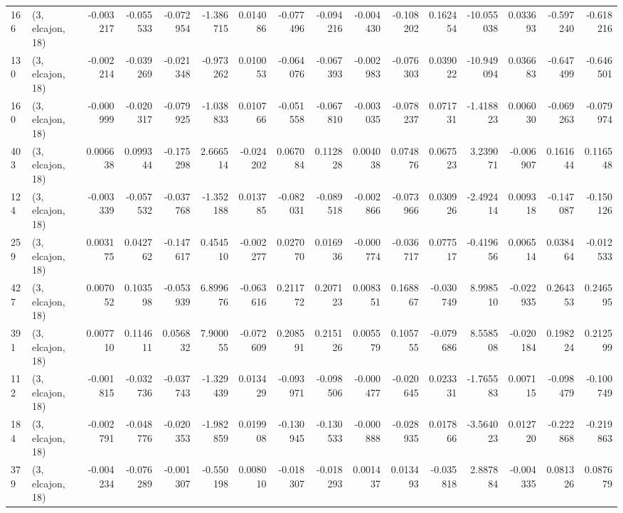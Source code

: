\begin{tabular}{llrrrrrrrrrrrrrr}
166 &  (3, elcajon, 18) &  -0.003217 & -0.055533 & -0.072954 &    -1.386715 &   0.014086 &  -0.077496 &  -0.094216 & -0.004430 & -0.108202 &  0.162454 &  -10.055038 &  0.033693 & -0.597240 & -0.618216 \\
130 &  (3, elcajon, 18) &  -0.002214 & -0.039269 & -0.021348 &    -0.973262 &   0.010053 &  -0.064076 &  -0.067393 & -0.002983 & -0.076303 &  0.039022 &  -10.949094 &  0.036683 & -0.647499 & -0.646501 \\
160 &  (3, elcajon, 18) &  -0.000999 & -0.020317 & -0.079925 &    -1.038833 &   0.010766 &  -0.051558 &  -0.067810 & -0.003035 & -0.078237 &  0.071731 &   -1.418823 &  0.006030 & -0.069263 & -0.079974 \\
403 &  (3, elcajon, 18) &   0.006638 &  0.099344 & -0.175298 &     2.666514 &  -0.024202 &   0.067084 &   0.112828 &  0.004038 &  0.074876 &  0.067523 &    3.239071 & -0.006907 &  0.161644 &  0.116548 \\
124 &  (3, elcajon, 18) &  -0.003339 & -0.057532 & -0.037768 &    -1.352188 &   0.013785 &  -0.082031 &  -0.089518 & -0.002866 & -0.073966 &  0.030926 &   -2.492414 &  0.009318 & -0.147087 & -0.150126 \\
259 &  (3, elcajon, 18) &   0.003175 &  0.042762 & -0.147617 &     0.454510 &  -0.002277 &   0.027070 &   0.016936 & -0.000774 & -0.036717 &  0.077517 &   -0.419656 &  0.006514 &  0.038464 & -0.012533 \\
427 &  (3, elcajon, 18) &   0.007052 &  0.103598 & -0.053939 &     6.899676 &  -0.063616 &   0.211772 &   0.207123 &  0.008351 &  0.168867 & -0.030749 &    8.998510 & -0.022935 &  0.264353 &  0.246595 \\
391 &  (3, elcajon, 18) &   0.007710 &  0.114611 &  0.056832 &     7.900055 &  -0.072609 &   0.208591 &   0.215126 &  0.005579 &  0.105755 & -0.079686 &    8.558508 & -0.020184 &  0.198224 &  0.212599 \\
112 &  (3, elcajon, 18) &  -0.001815 & -0.032736 & -0.037743 &    -1.329439 &   0.013429 &  -0.093971 &  -0.098506 & -0.000477 & -0.020645 &  0.023331 &   -1.765583 &  0.007115 & -0.098479 & -0.100749 \\
184 &  (3, elcajon, 18) &  -0.002791 & -0.048776 & -0.020353 &    -1.982859 &   0.019908 &  -0.130945 &  -0.130533 & -0.000888 & -0.028935 &  0.017866 &   -3.564023 &  0.012720 & -0.222868 & -0.219863 \\
379 &  (3, elcajon, 18) &  -0.004234 & -0.076289 & -0.001307 &    -0.550198 &   0.008010 &  -0.018307 &  -0.018293 &  0.001437 &  0.013493 & -0.035818 &    2.887884 & -0.004335 &  0.081326 &  0.087679 \\

\end{tabular}
